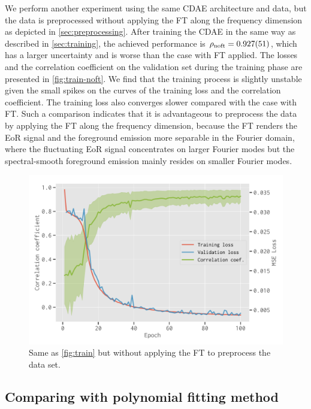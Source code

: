 \documentclass[letters,a4paper,fleqn,usenatbib]{mnras}
\newcommand{\R}[1]{\mathrm{#1}}
\begin{document}
We perform another experiment using the same CDAE architecture and data,
but the data is preprocessed without applying the FT along the
frequency dimension as depicted in \autoref{sec:preprocessing}.
After training the CDAE in the same way as described in
\autoref{sec:training}, the achieved performance is
$\rho_{\R{noft}} = \num{0.927 +- 0.051}$, which has a larger uncertainty
and is worse than the case with FT applied.
The losses and the correlation coefficient on the validation set
during the training phase are presented in \autoref{fig:train-noft}.
We find that the training process is slightly unstable given the small
spikes on the curves of the training loss and the correlation
coefficient.
The training loss also converges slower compared with the case with FT.
Such a comparison indicates that it is advantageous to preprocess the
data by applying the FT along the frequency dimension, because the FT
renders the EoR signal and the foreground emission more separable in
the Fourier domain, where the fluctuating EoR signal concentrates on
larger Fourier modes but the spectral-smooth foreground emission mainly
resides on smaller Fourier modes.

\begin{figure}
  \centering
  \includegraphics[width=\columnwidth]{cdae-train-noft}
  \caption{\label{fig:train-noft}%
    Same as \autoref{fig:train} but without applying the FT to
    preprocess the data set.
  }
\end{figure}


\subsection{Comparing with polynomial fitting method}
\label{sec:polyfit}
\end{document}
